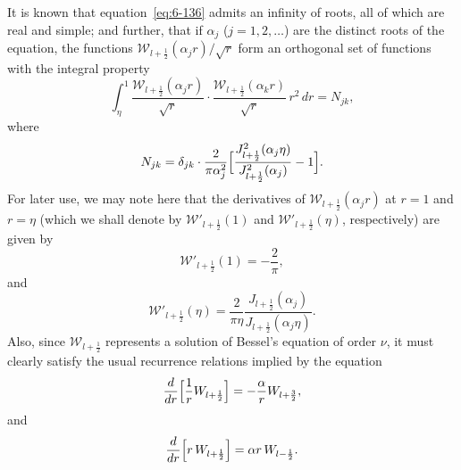 It is known that equation~\eqref{eq:6-136} admits an infinity of roots, all of which
are real and simple; and further, that if $\alpha_j$ ($j = 1, 2, \ldots$) are the distinct
roots of the equation, the functions $\mathscr{W}_{l+\frac{1}{2}}(\alpha_j r)/\sqrt{r}$ form an orthogonal set
of functions with the integral property
\begin{equation}\label{eq:6-137}
\int_\eta^1 \frac{\mathscr{W}_{l+\frac{1}{2}}(\alpha_j r)}{\sqrt{r}}\cdot\frac{\mathscr{W}_{l+\frac{1}{2}}(\alpha_k r)}{\sqrt{r}}\,r^2\,dr = N_{jk},
\end{equation}
where
\begin{equation}\label{eq:6-138}
N_{jk} = \delta_{jk}\cdot\frac{2}{\pi\alpha_j^2}\Bigl[\frac{J^2_{l+\frac{1}{2}}(\alpha_j\eta)}{J^2_{l+\frac{1}{2}}(\alpha_j)} - 1\Bigr].
\end{equation}
For later use, we may note here that the derivatives of $\mathscr{W}_{l+\frac{1}{2}}(\alpha_j r)$
at $r = 1$ and $r = \eta$ (which we shall denote by $\mathscr{W}'_{l+\frac{1}{2}}(1)$ and $\mathscr{W}'_{l+\frac{1}{2}}(\eta)$,
respectively) are given by
\begin{equation}\label{eq:6-139}
\mathscr{W}'_{l+\frac{1}{2}}(1) = -\frac{2}{\pi},
\end{equation}
and
\begin{equation}\label{eq:6-140}
\mathscr{W}'_{l+\frac{1}{2}}(\eta) = \frac{2}{\pi\eta}\frac{J_{l+\frac{1}{2}}(\alpha_j)}{J_{l+\frac{1}{2}}(\alpha_j\eta)}.
\end{equation}
Also, since $\mathscr{W}_{l+\frac{1}{2}}$ represents a solution of Bessel's equation of order
$\nu$, it must clearly satisfy the usual recurrence relations implied by the
equation
\begin{equation}\label{eq:6-141}
\frac{d}{dr}\Bigl[\frac{1}{r}\mathscr{W}_{l+\frac{1}{2}}\Bigr] = -\frac{\alpha}{r}\mathscr{W}_{l+\frac{3}{2}},
\end{equation}
and
\begin{equation}\label{eq:6-142}
\frac{d}{dr}\Bigl[r\,\mathscr{W}_{l+\frac{1}{2}}\Bigr] = \alpha r\,\mathscr{W}_{l-\frac{1}{2}}.
\end{equation}

